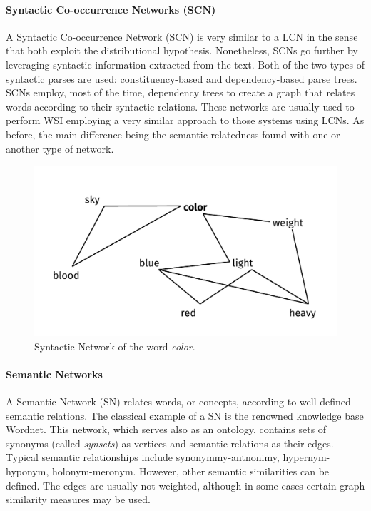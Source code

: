 \paragraph{Syntactic Co-occurrence Networks (SCN)}
A Syntactic Co-occurrence Network (SCN) is very similar to a LCN  in the sense that both exploit the distributional hypothesis. Nonetheless, SCNs go further by leveraging  syntactic information extracted from the text. Both of the two types of syntactic parses are used: constituency-based  and dependency-based parse trees. SCNs employ, most of the time, dependency trees to create a graph that relates words according to their syntactic relations. 
 These networks are usually used to perform WSI employing a very similar approach to those systems using LCNs. As before, the main difference being the semantic relatedness found with one or another type of network.


\begin{figure}[!h]
\centering
\includegraphics[width=0.7\linewidth]{images/Chapitre2/syn_net1.pdf}
\caption{Syntactic Network of the word \textit{color}.}
\label{fig:syn_net1}
\end{figure}

\paragraph{Semantic Networks}
A Semantic Network (SN) relates words, or concepts, according to well-defined semantic relations. The classical example of a SN is the renowned knowledge base Wordnet. This network, which serves also as an ontology, contains sets of synonyms (called \textit{synsets}) as vertices and semantic relations as their edges. Typical semantic relationships include synonymmy-antnonimy, hypernym-hyponym, holonym-meronym. However, other semantic similarities can be defined. The edges are usually not weighted, although in some cases certain graph similarity measures may be used.

